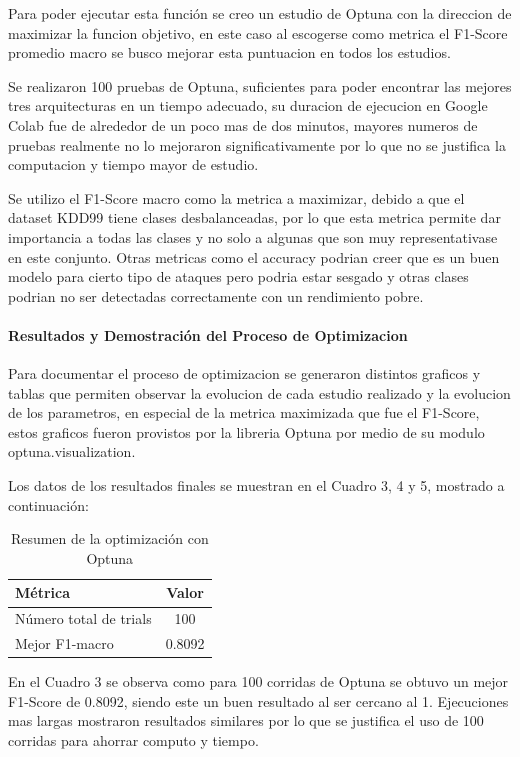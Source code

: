 \documentclass[12pt,a4paper]{article}
\begin{document}
Para poder ejecutar esta función se creo un estudio de Optuna con la direccion de maximizar la funcion objetivo,
en este caso al escogerse como metrica el F1-Score promedio macro se busco mejorar esta puntuacion en todos los estudios.

Se realizaron 100 pruebas de Optuna, suficientes para poder encontrar las mejores tres arquitecturas en un tiempo adecuado,
su duracion de ejecucion en Google Colab fue de alrededor de un poco mas de dos minutos,
mayores numeros de pruebas realmente no lo mejoraron significativamente por lo que no se justifica la computacion
y tiempo mayor de estudio.

Se utilizo el F1-Score macro como la metrica a maximizar, debido a que el dataset KDD99 tiene clases desbalanceadas,
por lo que esta metrica permite dar importancia a todas las clases y no solo a algunas que son muy representativase
en este conjunto. Otras metricas como el accuracy podrian creer que es un buen modelo para cierto tipo de ataques
pero podria estar sesgado y otras clases podrian no ser detectadas correctamente con un rendimiento pobre.

\paragraph{Resultados y Demostración del Proceso de Optimizacion}

Para documentar el proceso de optimizacion se generaron distintos graficos y tablas que permiten observar la evolucion de cada estudio
realizado y la evolucion de los parametros, en especial de la metrica maximizada que fue el F1-Score, estos
graficos fueron provistos por la libreria Optuna por medio de su modulo optuna.visualization.

Los datos de los resultados finales se muestran en el Cuadro 3, 4 y 5, mostrado a continuación:

\begin{table}[htbp]
  \centering
  \begin{tabular}{l c}
    \hline
    Métrica & Valor \\
    \hline
    Número total de trials & 100 \\
    Mejor F1-macro & 0.8092 \\
    \hline
  \end{tabular}
  \caption{Resumen de la optimización con Optuna}
  \label{tab:optuna_resumen}
\end{table}

En el Cuadro 3 se observa como para 100 corridas de Optuna se obtuvo un mejor F1-Score de 0.8092,
siendo este un buen resultado al ser cercano al 1. Ejecuciones mas largas mostraron resultados similares
por lo que se justifica el uso de 100 corridas para ahorrar computo y tiempo.
\end{document}
